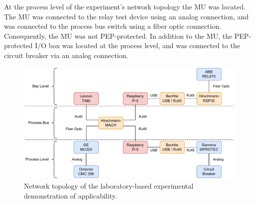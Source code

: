 At the process level of the experiment's network topology the MU was located.
The MU was connected to the relay test device using an analog connection, and was connected to the process bus switch using a fiber optic connection.
Consequently, the MU was not PEP-protected.
In addition to the MU, the PEP-protected I/O box was located at the process level, and was connected to the circuit breaker via an analog connection.
\begin{figure}
    \centering
    \includegraphics[width=1.0\linewidth]{figures/lab_evaluation_topology.drawio.pdf}
    \caption{Network topology of the laboratory-based experimental demonstration of applicability.}
    \label{fig:lab_topology}
\end{figure}

